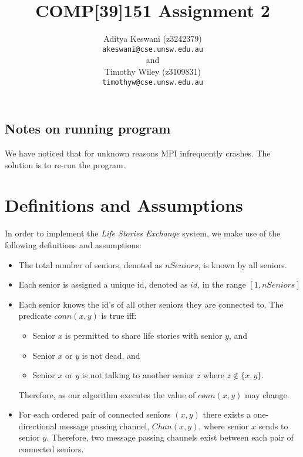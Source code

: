 \documentclass[12pt,a4paper]{scrartcl}
\begin{document}
\title{COMP[39]151 Assignment 2}
\author{Aditya Keswani (z3242379) \\ 
        \texttt{akeswani@cse.unsw.edu.au} \\ 
        and \\ 
        Timothy Wiley (z3109831) \\
        \texttt{timothyw@cse.unsw.edu.au} }

\maketitle

\tableofcontents

\subsection{Notes on running program}
We have noticed that for unknown reasons MPI infrequently crashes.
The solution is to re-run the program.

\section{Definitions and Assumptions}
In order to implement the \emph{Life Stories Exchange} system, we make use of the following definitions and assumptions:
\begin{itemize}
    \item The total number of seniors, denoted as $nSeniors$, is known by all seniors.
    \item Each senior is assigned a unique id, denoted as $id$, in the range $[1,nSeniors]$
    \item Each senior knows the id's of all other seniors they are connected to.
          The predicate $conn(x,y)$ is true iff:
          \begin{itemize}
              \item Senior $x$ is permitted to share life stories with senior $y$, and
              \item Senior $x$ or $y$ is not dead, and
              \item Senior $x$ or $y$ is not talking to another senior $z$ where $z \notin \{x,y\}$.
          \end{itemize}
          Therefore, as our algorithm executes the value of $conn(x,y)$ may change.
    \item For each ordered pair of connected seniors $(x,y)$ there exists a one-directional message passing channel, $Chan(x,y)$, where senior $x$ sends to senior $y$.
          Therefore, two message passing channels exist between each pair of connected seniors.
\end{itemize}
\end{document}

